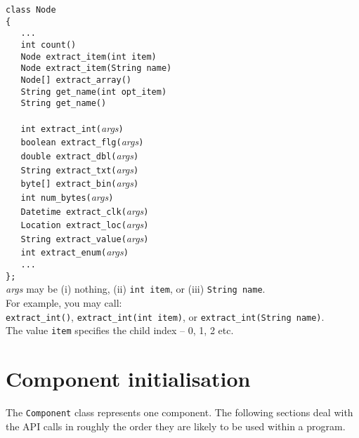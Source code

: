 \documentclass[12pt,a4paper,twoside]{article}
\renewcommand{\_}{\texttt{\symbol{95}}}
\begin{document}
\verb^class Node^\\
\verb^{^\\
\verb^   ...^\\
\verb^   int count()^\\
\verb^   Node extract_item(int item)^\\
\verb^   Node extract_item(String name)^\\
\verb^   Node[] extract_array()^\\
\verb^   String get_name(int opt_item)^\\
\verb^   String get_name()^\\
\verb^	^\\
\verb^   int extract_int(^\textit{args}\verb^)^\\
\verb^   boolean extract_flg(^\textit{args}\verb^)^\\
\verb^   double extract_dbl(^\textit{args}\verb^)^\\
\verb^   String extract_txt(^\textit{args}\verb^)^\\
\verb^   byte[] extract_bin(^\textit{args}\verb^)^\\
\verb^   int num_bytes(^\textit{args}\verb^)^\\
\verb^   Datetime extract_clk(^\textit{args}\verb^)^\\
\verb^   Location extract_loc(^\textit{args}\verb^)^\\
\verb^   String extract_value(^\textit{args}\verb^)^\\
\verb^   int extract_enum(^\textit{args}\verb^)^\\
\verb^   ...^\\
\verb^};^\\

\textit{args} may be (i) nothing, (ii) \verb^int item^, or (iii)
\verb^String name^.\\
For example, you may call:\\
\verb^extract_int()^, \verb^extract_int(int item)^,
or \verb^extract_int(String name)^.\\
The value \verb^item^ specifies the child index -- 0, 1, 2 etc.

\section{Component initialisation}

The \verb^Component^ class represents one component.
The following sections deal with the API calls in roughly the order
they are likely to be used within a program.
\end{document}
